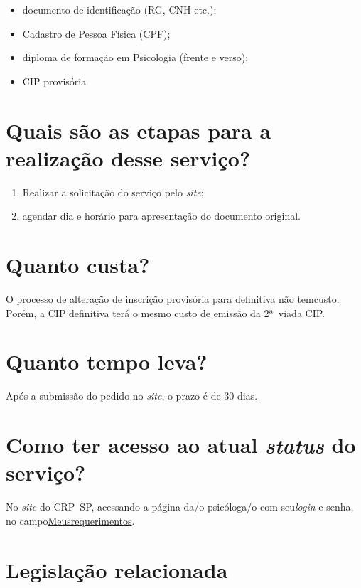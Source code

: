 \begin{itemize}
  \item  documento de identificação (RG, CNH etc.);
  \item  Cadastro de Pessoa Física (CPF);
  \item  diploma de formação em Psicologia (frente e verso);
  \item  CIP provisória
\end{itemize}

\section{Quais são as etapas para a realização desse serviço?}

\begin{enumerate}
  \item  Realizar a solicitação do serviço pelo \emph{site};
  \item  agendar dia e horário para apresentação do documento original.
\end{enumerate}

\section{Quanto custa?}

O processo de alteração de inscrição provisória para definitiva não temcusto. Porém, a CIP definitiva terá o mesmo custo de emissão da 2ª~viada CIP.

\section{Quanto tempo leva?}

Após a submissão do pedido no \emph{site}, o prazo é de 30 dias.

\section{Como ter acesso ao atual \emph{status} do serviço?}

No \emph{site} do CRP~SP, acessando a página da/o psicóloga/o com seu\emph{login} e senha, no campo\href{https://cfpsp.brctotal.com/crp06_servicosonline/pgsRequerimento/MeusRequerimentos.aspx}{Meusrequerimentos}.

\section{Legislação relacionada}

